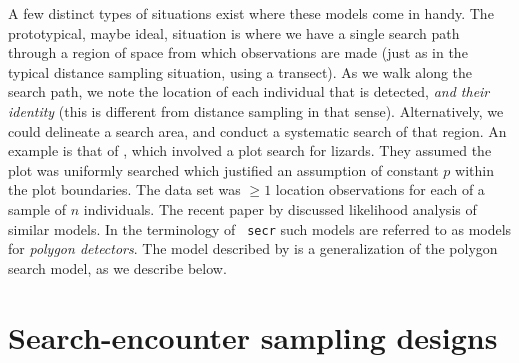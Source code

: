 A few distinct types of situations exist where these models come in
handy. The prototypical, maybe ideal, situation
\citet{royle_etal:2011mee} is where we have a single search path
through a region of space from which observations are made (just as in
the typical distance sampling situation, using a transect). As we walk
along the search path, we note the location of each individual that is
detected, {\it and their identity} (this is different from distance
sampling in that sense). 
Alternatively, we could delineate a search
area, and conduct a systematic search of that region. An example is
that of \citet{royle_young:2008}, which involved a plot search for
lizards. They assumed the plot was uniformly searched which justified
an assumption of constant $p$ within the plot boundaries. 
The data set
was $\ge 1$ location observations for each of a sample of $n$
individuals.  The recent paper by \citet{efford:2011} discussed
likelihood analysis of similar models. In the terminology of \mbox{\tt
  secr} such models are referred to as models for {\it polygon
  detectors}.  The model described by \citep{royle_etal:2011mee} is a
generalization of the polygon search model, as we describe below.

\section{Search-encounter sampling designs}

